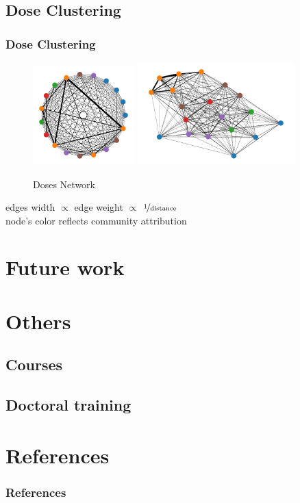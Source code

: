 \documentclass{beamer}
\begin{document}
	\subsection{Dose Clustering}
	\begin{frame}
		\frametitle{Dose Clustering}
		\begin{figure}
			\centering
			\includegraphics[width=0.35\textwidth]{figures/graph.pdf}
			\includegraphics[width=0.54\textwidth]{figures/graph_bis.pdf}
			\caption{Doses Network}
			\label{fig:graph}
		\end{figure}
		edges width $\propto$ edge weight $\propto$ $\nicefrac{\text{1}}{\text{distance}}$\\
		node's color reflects community attribution
	\end{frame}
	
	\section{Future work}
	
	\section{Others}
	\subsection{Courses}
	\subsection{Doctoral training}
	\section{References}
	\begin{frame}
		\frametitle{References}
		
	\end{frame}
	

	

	
	
	
	
	
	
	
	
\end{document}
